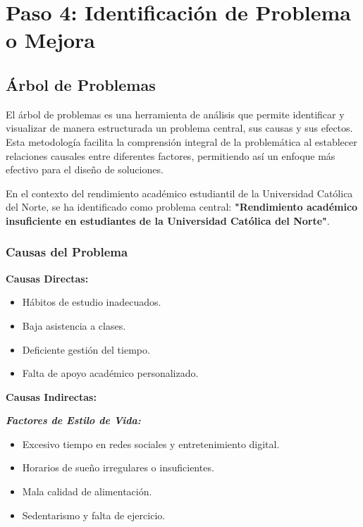 \documentclass[12pt,letterpaper]{report}
\begin{document}
\section{Paso 4: Identificación de Problema o Mejora}

\subsection{Árbol de Problemas}

El árbol de problemas es una herramienta de análisis que permite identificar y visualizar de manera estructurada un problema central, sus causas y sus efectos. Esta metodología facilita la comprensión integral de la problemática al establecer relaciones causales entre diferentes factores, permitiendo así un enfoque más efectivo para el diseño de soluciones.

En el contexto del rendimiento académico estudiantil de la Universidad Católica del Norte, se ha identificado como problema central: \textbf{"Rendimiento académico insuficiente en estudiantes de la Universidad Católica del Norte"}.

\subsubsection{Causas del Problema}

\textbf{Causas Directas:}
\begin{itemize}
    \item Hábitos de estudio inadecuados.
    \item Baja asistencia a clases.
    \item Deficiente gestión del tiempo.
    \item Falta de apoyo académico personalizado.
\end{itemize}

\textbf{Causas Indirectas:}

\textbf{\textit{Factores de Estilo de Vida:}}
\vspace{0.1cm}
\begin{itemize}
    \item Excesivo tiempo en redes sociales y entretenimiento digital.
    \item Horarios de sueño irregulares o insuficientes.
    \item Mala calidad de alimentación.
    \item Sedentarismo y falta de ejercicio.
\end{itemize}
\end{document}
